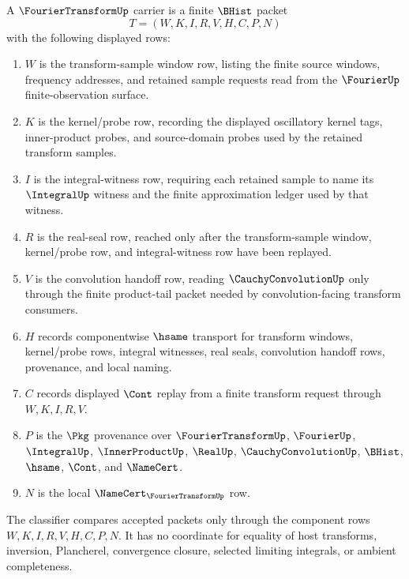 \begin{definition}\label{def:fourier-transform-carrier}
A $\FourierTransformUp$ carrier is a finite $\BHist$ packet
$$
T=(W,K,I,R,V,H,C,P,N)
$$
with the following displayed rows:
\begin{enumerate}
\item $W$ is the transform-sample window row, listing the finite source windows, frequency addresses, and retained sample requests read from the $\FourierUp$ finite-observation surface.
\item $K$ is the kernel/probe row, recording the displayed oscillatory kernel tags, inner-product probes, and source-domain probes used by the retained transform samples.
\item $I$ is the integral-witness row, requiring each retained sample to name its $\IntegralUp$ witness and the finite approximation ledger used by that witness.
\item $R$ is the real-seal row, reached only after the transform-sample window, kernel/probe row, and integral-witness row have been replayed.
\item $V$ is the convolution handoff row, reading $\CauchyConvolutionUp$ only through the finite product-tail packet needed by convolution-facing transform consumers.
\item $H$ records componentwise $\hsame$ transport for transform windows, kernel/probe rows, integral witnesses, real seals, convolution handoff rows, provenance, and local naming.
\item $C$ records displayed $\Cont$ replay from a finite transform request through $W,K,I,R,V$.
\item $P$ is the $\Pkg$ provenance over $\FourierTransformUp$, $\FourierUp$, $\IntegralUp$, $\InnerProductUp$, $\RealUp$, $\CauchyConvolutionUp$, $\BHist$, $\hsame$, $\Cont$, and $\NameCert$.
\item $N$ is the local $\NameCert_{\FourierTransformUp}$ row.
\end{enumerate}
The classifier compares accepted packets only through the component rows $W,K,I,R,V,H,C,P,N$. It has no coordinate for equality of host transforms, inversion, Plancherel, convergence closure, selected limiting integrals, or ambient completeness.
\end{definition}

